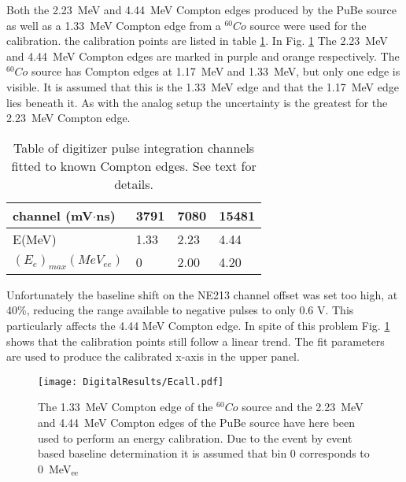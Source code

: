 \documentclass[main.tex]{subfiles}
\begin{document}
Both the \SI{2.23}{\MeV} and \SI{4.44}{\MeV} Compton edges produced by the PuBe source as well as a \SI{1.33}{MeV} Compton edge from a $^{60}Co$ source were used for the calibration. the calibration points are listed in table \ref{tab:knox_d}. In Fig. \ref{fig:D_QDC} The \SI{2.23}{\MeV} and \SI{4.44}{\MeV} Compton edges are marked in purple and orange respectively. The $^{60}Co$ source has Compton edges at \SI{1.17}{\MeV} and \SI{1.33}{\MeV}, but only one edge is visible. It is assumed that this is the \SI{1.33}{\MeV} edge and that the \SI{1.17}{\MeV} edge lies beneath it. As with the analog setup the uncertainty is the greatest for the \SI{2.23}{\MeV} Compton edge.

\begin{table}[hb]
	\center
	\begin{tabular}{|l|l|l|l|}
	\hline
	channel (mV$\cdot$ns)            & 3791 & 7080  & 15481  \\
	\hline
	E(MeV)          & 1.33    & 2.23  & 4.44 \\
	\hline
	$(E_{e})_{max}(MeV_{ee})$ & 0    & 2.00  & 4.20 \\
	\hline
	\end{tabular}
   	\captionsetup{width=0.435\linewidth}
	\caption[Table of values used for energy calibration, digital setup.]{Table of digitizer pulse integration channels fitted to known Compton edges. See text for details.}
	\label{tab:knox_d}
\end{table}

Unfortunately the baseline shift on the NE213 channel offset was set too high, at 40\%, reducing the range available to negative pulses to only 0.6 V. This particularly affects the 4.44 \si{\MeV} Compton edge. In spite of this problem Fig. \ref{fig:D_QDC} shows that the calibration points still follow a linear trend. The fit parameters are used to produce the calibrated x-axis in the upper panel.

\begin{figure}[ht]
    \centering
        \texttt{[image: DigitalResults/Ecall.pdf]}
        \caption[Energy calibration of the digital setup]{The \SI{1.33}{\MeV} Compton edge of the $^{60}Co$ source and the \SI{2.23}{\MeV} and \SI{4.44}{\MeV} Compton edges of the PuBe source have here been used to perform an energy calibration. Due to the event by event based baseline determination it is assumed that bin 0 corresponds to \SI{0}{\MeV}$_\text{ee}$}
    \label{fig:D_QDC}
\end{figure}
\end{document}
